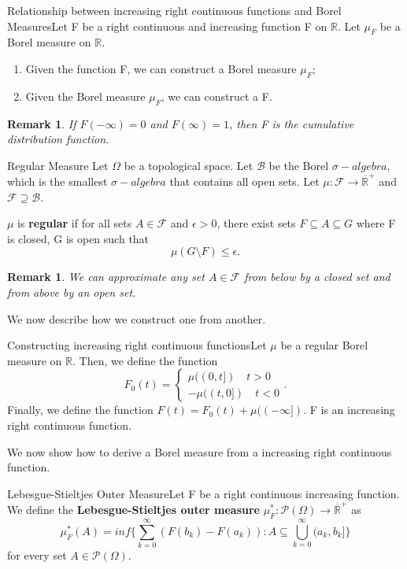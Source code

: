 \documentclass[twoside]{article}
\newtheorem{remark}[theorem]{Remark}
\newcommand{\sigmalgebra}{\mathcal{F}}
\newcommand{\sa}{\sigma-algebra}
\newcommand{\powerset}{\mathcal{P}}
\newcommand{\positiveextendedreal}{\overline{\mathbb{R}}^+}
\begin{document}
\begin{proposition_exam}{Relationship between increasing right continuous functions and Borel Measures}{}Let F be a right continuous and increasing function F on $\mathbb{R}$. Let $\mu_F$ be a Borel measure on $\mathbb{R}.$
\begin{enumerate}
\item Given the function F, we can construct a Borel measure $\mu_F$;
\item Given the Borel measure $\mu_F$, we can construct a F.
\end{enumerate}
\end{proposition_exam}

\begin{remark}If $F(-\infty) = 0$ and $F(\infty) = 1$, then F is the cumulative distribution function.
\end{remark}


\begin{definition_exam}{Regular Measure}{} Let $\Omega$ be a topological space. Let $\mathcal{B}$ be the Borel $\sa$, which is the smallest $\sa$ that contains all open sets. Let $\mu: \sigmalgebra \rightarrow \positiveextendedreal$ and $\sigmalgebra \supseteq \mathcal{B}$. 

$\mu$ is \textbf{regular} if for all sets $A \in \sigmalgebra$ and $\epsilon > 0$, there exist sets $F \subseteq A \subseteq G$ where F is closed, G is open such that 
$$
\mu(G \text{\textbackslash} F) \leq \epsilon.
$$
\end{definition_exam}

\begin{remark}We can approximate any set $A \in \sigmalgebra$ from below by a closed set and from above by an open set.
\end{remark}


We now describe how we construct one from another.

\begin{proposition_exam}{Constructing increasing right continuous functions}{}Let $\mu$ be a regular Borel measure on $\mathbb{R}.$ Then, we define the function
$$
F_0(t) = \begin{cases}
\mu((0,t]) \quad t > 0\\
-\mu((t,0]) \quad t < 0
\end{cases}.
$$
Finally, we define the function $F(t) = F_0(t) + \mu((-\infty]).$ F is an increasing right continuous function.
\end{proposition_exam}


We now show how to derive a Borel measure from a increasing right continuous function.
\begin{definition_exam}{Lebesgue-Stieltjes Outer Measure}{}Let F be a right continuous increasing function. We define the \textbf{Lebesgue-Stieltjes outer measure} $\mu_{F}^{*}:\powerset(\Omega) \rightarrow \positiveextendedreal$ as 
$$
\mu_{F}^{*}(A) = inf \bigg\{\sum_{k=0}^{\infty}(F(b_k) - F(a_k)): A \subseteq \bigcup_{k=0}^{\infty}(a_k,b_k] \bigg\}
$$
for every set $A \in \powerset(\Omega).$
\end{definition_exam}
\end{document}
